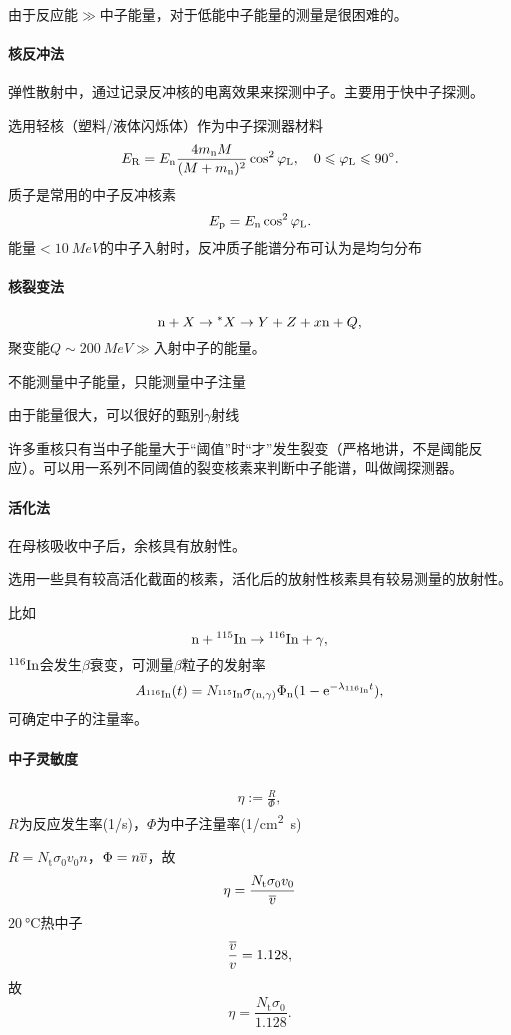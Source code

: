由于反应能$\gg$中子能量，对于低能中子能量的测量是很困难的。
\paragraph{核反冲法}弹性散射中，通过记录反冲核的电离效果来探测中子。主要用于快中子探测。

选用轻核（塑料/液体闪烁体）作为中子探测器材料
\[
	E_{\mathrm{R}}=E_\mathrm n\frac{4m_\mathrm n M}{(M+m_\mathrm n)^2}\cos^2\varphi_{\mathrm L},\quad 0\leqslant\varphi_{\mathrm L}\leqslant 90^\circ.
\]
质子是常用的中子反冲核素
\[
	E_\mathrm p=E_\mathrm n\cos^2\varphi_{\mathrm L}.
\]
能量$<\SI{10}{MeV}$的中子入射时，反冲质子能谱分布可认为是均匀分布
\paragraph{核裂变法}
\[
	\mathrm n+X\to{}^\ast X\to Y+Z+x\mathrm n+Q,
\]
聚变能$Q\sim\SI{200}{MeV}\gg$入射中子的能量。
\begin{compactitem}
	\item 不能测量中子能量，只能测量中子注量
	\item 由于能量很大，可以很好的甄别$\gamma$射线
\end{compactitem}
许多重核只有当中子能量大于“阈值”时“才”发生裂变（严格地讲，不是阈能反应）。可以用一系列不同阈值的裂变核素来判断中子能谱，叫做阈探测器。
\paragraph{活化法}
在母核吸收中子后，余核具有放射性。

选用一些具有较高活化截面的核素，活化后的放射性核素具有较易测量的放射性。

比如
\[
	\mathrm n+{^{115}\mathrm{In}}\to{^{116}\mathrm{In}}+\gamma,
\]
${^{116}\mathrm{In}}$会发生$\beta$衰变，可测量$\beta$粒子的发射率
\[
	A_{{^{116}\mathrm{In}}}(t)=N_{{^{115}\mathrm{In}}}\sigma_{(\mathrm n,\gamma)}\Phi_\mathrm n(1-\mathop{}\!\mathrm{e}^{-\lambda_{{^{116}\mathrm{In}}}t}),
\]
可确定中子的注量率。
\paragraph{中子灵敏度}
\begin{align}
	\eta:=\frac R\Phi,
\end{align}
$R$为反应发生率(1/s)，$\Phi$为中子注量率(\si{1/cm^2.s})

$R=N_\mathrm t\sigma_0v_0n$，$\Phi=n\overline{v}$，故 
\[
	\eta=\frac{N_\mathrm t\sigma_0v_0}{\overline{v}}
\]
$\SI{20}{\celsius}$热中子
\[
	\frac{\overline{v}}v=1.128,
\]
故
\[
	\eta=\frac{N_\mathrm t\sigma_0}{1.128}.
\]
\iffalse
\begin{compactenum}
	\item 
\end{compactenum}
\begin{compactitem}
	\item 
\end{compactitem}
\fi

